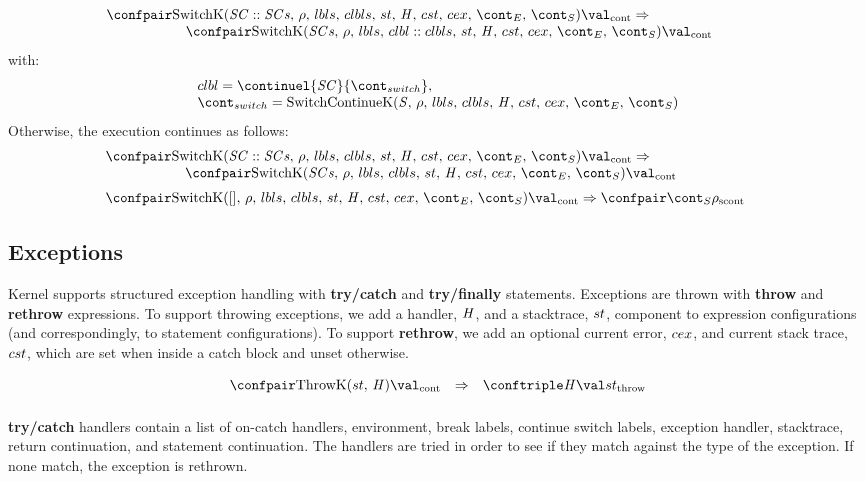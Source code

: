 \documentclass{article}
\begin{document}
\[
  \begin{array}{lcl}
	\contconf{\SwitchK{\scase :: \scases}{\clbls}}{\val}
	\Rightarrow \hspace{30mm}\\
	\hspace{20mm}\contconf{\SwitchK{\scases}{\clbl :: \clbls}}{\val}
  \end{array}
\]
with:
\[
  \begin{array}{l}
	\clbl = \continuel{\scase}{\switchcont},\\
	\switchcont = \ContinueK
  \end{array}
\]
\noindent
Otherwise, the execution continues as follows:
\[
  \begin{array}{lcl}
    \contconf{\SwitchK{\scase :: \scases}{\clbls}}{\val}
	\Rightarrow \hspace{30mm}\\
	\hspace{20mm}\contconf{\SwitchK{\scases}{\clbls}}{\val}\\[2mm]

	\contconf{\SwitchK{[]}{\clbls}}{\val}
	\Rightarrow
	\scontconf{\scont}{\env}
  \end{array}
\]

\subsection{Exceptions}

Kernel supports structured exception handling with \textbf{try/catch} and \textbf{try/finally} statements.
Exceptions are thrown with \textbf{throw} and \textbf{rethrow} expressions.
To support throwing exceptions, we add a handler, $\mathit{H}$, and a stacktrace, $st$, component to expression configurations (and correspondingly, to statement configurations).
To support \textbf{rethrow}, we add an optional current error, $cex$, and current stack trace, $cst$, which are set when inside a catch block and unset otherwise.

\[
  \begin{array}{lcl}
	\contconf{\ThrowH{\strace}{\handler}}{\val}
	& \Rightarrow &
	\throwconf{\handler}{\val}{\strace}\\[2mm]

  \end{array}
\]

\noindent
\textbf{try/catch} handlers contain a list of on-catch handlers, environment, break labels, continue switch labels, exception handler, stacktrace, return continuation, and statement continuation.
The handlers are tried in order to see if they match against the type of the exception.
If none match, the exception is rethrown.
\end{document}
